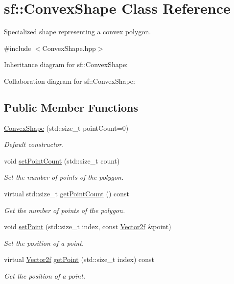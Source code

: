 \hypertarget{classsf_1_1_convex_shape}{}\section{sf\+:\+:Convex\+Shape Class Reference}
\label{classsf_1_1_convex_shape}


Specialized shape representing a convex polygon.  




{\ttfamily \#include $<$Convex\+Shape.\+hpp$>$}



Inheritance diagram for sf\+:\+:Convex\+Shape\+:


Collaboration diagram for sf\+:\+:Convex\+Shape\+:
\subsection*{Public Member Functions}
\begin{DoxyCompactItemize}
\item 
\hyperlink{classsf_1_1_convex_shape_af9981b8909569b381b3fccf32fc69856}{Convex\+Shape} (std\+::size\+\_\+t point\+Count=0)
\begin{DoxyCompactList}\small\item\em Default constructor. \end{DoxyCompactList}\item 
void \hyperlink{classsf_1_1_convex_shape_a56e6e79ade6dd651cc1a0e39cb68deae}{set\+Point\+Count} (std\+::size\+\_\+t count)
\begin{DoxyCompactList}\small\item\em Set the number of points of the polygon. \end{DoxyCompactList}\item 
virtual std\+::size\+\_\+t \hyperlink{classsf_1_1_convex_shape_a0c54b8d48fe4e13414f6e667dbfc22a3}{get\+Point\+Count} () const
\begin{DoxyCompactList}\small\item\em Get the number of points of the polygon. \end{DoxyCompactList}\item 
void \hyperlink{classsf_1_1_convex_shape_a5929e0ab0ba5ca1f102b40c234a8e92d}{set\+Point} (std\+::size\+\_\+t index, const \hyperlink{classsf_1_1_vector2}{Vector2f} \&point)
\begin{DoxyCompactList}\small\item\em Set the position of a point. \end{DoxyCompactList}\item 
virtual \hyperlink{classsf_1_1_vector2}{Vector2f} \hyperlink{classsf_1_1_convex_shape_a72a97bc426d8daf4d682a20fcb7f3fe7}{get\+Point} (std\+::size\+\_\+t index) const
\begin{DoxyCompactList}\small\item\em Get the position of a point. \end{DoxyCompactList}\end{DoxyCompactItemize}
